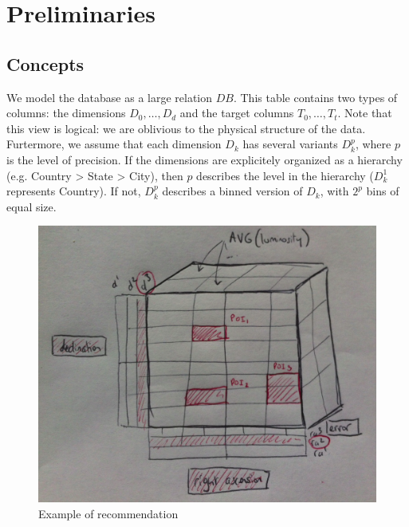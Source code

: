 \section{Preliminaries}

\subsection{Concepts}
We model the database as a large relation $DB$. This table contains two types of
columns: the dimensions $D_0, \ldots, D_d$ and the target columns $T_0, \ldots,
T_t$.  Note that this view is logical: we are oblivious to the physical
structure of the data. Furtermore, we assume that each dimension $D_k$ has
several variants $D_k^p$, where $p$ is the level of precision.  If the
dimensions are explicitely organized as a hierarchy (e.g.  Country > State >
City), then $p$ describes the level in the hierarchy ($D_k^1$ represents
Country). If not, $D_k^p$ describes a binned version of $D_k$, with $2^p$ bins
of equal size.

\begin{figure}[t!]
\centering
\includegraphics[width=\columnwidth]{images/cube}
\caption{Example of recommendation}
\label{cube}
\end{figure}

